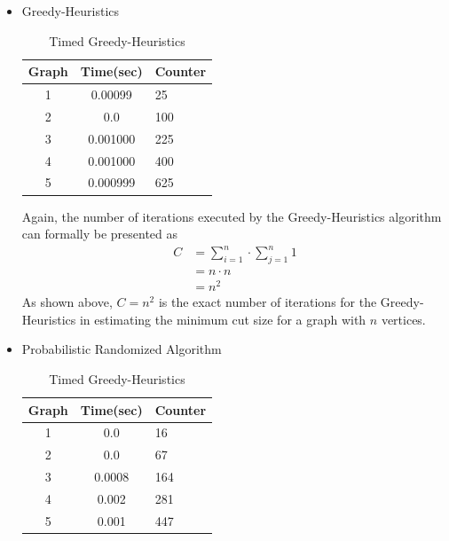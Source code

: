 \documentclass[longpaper, english, final, times]{revdetua}
\begin{document}
\begin{itemize}
				\item Greedy-Heuristics
					\begin{table}[h]
						\caption{Timed Greedy-Heuristics}
						\label{table:timedgreedy}
						\begin{center}					
							{\renewcommand{\arraystretch}{2}
								\begin{tabular}{|c|c|l|}
									\hline
									Graph& Time(sec) & Counter\\
									\hline
									1&0.00099&25\\
									2&0.0&100\\
									3&0.001000&225\\
									4&0.001000&400\\
									5&0.000999&625\\
									\hline
								\end{tabular}
							}
						\end{center}
					\end{table}
					
					Again, the number of iterations executed by the Greedy-Heuristics algorithm can formally be presented as 
					\begin{align*}
						C&=\sum_{i=1}^{n}\cdot \sum_{j=1}^{n}1\\
						&=n\cdot n\\
						&=n^2
					\end{align*}
					As shown above, $C=n^2$ is the exact number of iterations for the Greedy-Heuristics in estimating the minimum cut size for a graph with $n$ vertices.
					
				\item Probabilistic Randomized Algorithm
					\begin{table}[h]
						\caption{Timed Greedy-Heuristics}
						\label{table:probrandom}
						\begin{center}					
							{\renewcommand{\arraystretch}{2}
								\begin{tabular}{|c|c|l|}
									\hline
									Graph& Time(sec) & Counter\\
									\hline
									1&0.0&16\\
									2&0.0&67\\
									3&0.0008&164\\
									4&0.002&281\\
									5&0.001&447\\
									\hline
								\end{tabular}
							}
						\end{center}
					\end{table}
					

\end{itemize}
\end{document}
